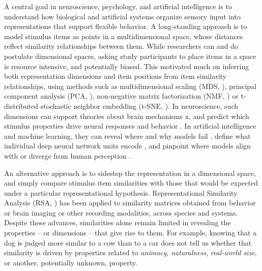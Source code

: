 \documentclass{article}
\begin{document}
A central goal in neuroscience, psychology, and artificial intelligence is to understand how biological and artificial systems organize sensory input into representations that support flexible behavior. A long-standing approach is to model stimulus items as points in a multidimensional space, whose distances reflect similarity relationships between them\citep{Torgerson1952,Shepard1957,Shepard1962,Nosofsky1986}. While researchers can and do postulate dimensional spaces, asking study participants to place items in a space is resource intensive, and potentially biased. This motivated much on inferring both representation dimensions and item positions from item similarity relationships, using methods such as multidimensional scaling (MDS, \cite{Torgerson1952}), principal component analysis (PCA, \cite{Jolliffe1986} ), non-negative matrix factorization (NMF, \cite{Lee1999}) or t-distributed stochastic neighbor embedding (t-SNE, \cite{Maaten2008}). In neuroscience, such dimensions can support theories about brain mechanisms x\citep{Naselaris2011, Kriegeskorte2021, Bracci2023}, and predict which stimulus properties drive neural responses \citep{Contier2024, Khosla2022, Sorscher2022, Jagadeesh2022, Bao2020} and behavior \citep{Roads2024-01, Hebart2020}. In artificial intelligence and machine learning, they can reveal where and why models fail \citep{Geirhos2021,Geirhos2024}, define what individual deep neural network units encode \citep{Bau2017,Olah2017}, and pinpoint where models align with or diverge from human perception \citep{Sucholutsky2025,Mahner2025, Du2025}.

An alternative approach is to sidestep the representation in a dimensional space, and simply compare stimulus item similarities with those that would be expected under a particular representational hypothesis. Representational Similarity Analysis (RSA, \citep{Kriegeskorte2008-01}) has been applied to similarity matrices obtained from behavior or brain imaging or other recording modalities, across species and systems. Despite these advances, similarities alone remain limited in revealing the properties -- or dimensions -- that give rise to them. For example, knowing that a dog is judged more similar to a cow than to a car does not tell us whether that similarity is driven by properties related to \textit{animacy}, \textit{naturalness}, \textit{real-world size}, or another, potentially unknown, property. 
\end{document}
